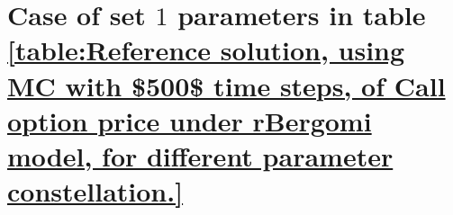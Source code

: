 
\section{Case of set $1$ parameters in table \ref{table:Reference solution, using MC with $500$ time steps, of Call option price under rBergomi model, for different parameter constellation.}}\label{appendix:Case of set 1 parameters}

